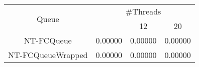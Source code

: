 \begin{tabular}{|c|c|c|c|}
\hline
\multirow{2}{*}{Queue} & \multicolumn{3}{c|}{\#Threads}\\\cline{2-4}& \quad 4 & 12 & 20\\
\hline
\hline
NT-FCQueue & 0.00000 & 0.00000 & 0.00000\\
NT-FCQueueWrapped & 0.00000 & 0.00000 & 0.00000\\
\hline\end{tabular}

